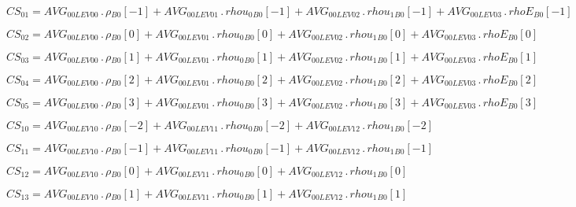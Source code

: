 \documentclass{article}
\begin{document}
\begin{dmath}CS_{01} = AVG_{0 0 LEV 00} \,.\, {\rho{_{B0}}}[{-1}] + AVG_{0 0 LEV 01} \,.\, {rhou_{0}{_{B0}}}[{-1}] + AVG_{0 0 LEV 02} \,.\, {rhou_{1}{_{B0}}}[{-1}] + AVG_{0 0 LEV 03} \,.\, {rhoE{_{B0}}}[{-1}]\end{dmath}

\begin{dmath}CS_{02} = AVG_{0 0 LEV 00} \,.\, {\rho{_{B0}}}[{0}] + AVG_{0 0 LEV 01} \,.\, {rhou_{0}{_{B0}}}[{0}] + AVG_{0 0 LEV 02} \,.\, {rhou_{1}{_{B0}}}[{0}] + AVG_{0 0 LEV 03} \,.\, {rhoE{_{B0}}}[{0}]\end{dmath}

\begin{dmath}CS_{03} = AVG_{0 0 LEV 00} \,.\, {\rho{_{B0}}}[{1}] + AVG_{0 0 LEV 01} \,.\, {rhou_{0}{_{B0}}}[{1}] + AVG_{0 0 LEV 02} \,.\, {rhou_{1}{_{B0}}}[{1}] + AVG_{0 0 LEV 03} \,.\, {rhoE{_{B0}}}[{1}]\end{dmath}

\begin{dmath}CS_{04} = AVG_{0 0 LEV 00} \,.\, {\rho{_{B0}}}[{2}] + AVG_{0 0 LEV 01} \,.\, {rhou_{0}{_{B0}}}[{2}] + AVG_{0 0 LEV 02} \,.\, {rhou_{1}{_{B0}}}[{2}] + AVG_{0 0 LEV 03} \,.\, {rhoE{_{B0}}}[{2}]\end{dmath}

\begin{dmath}CS_{05} = AVG_{0 0 LEV 00} \,.\, {\rho{_{B0}}}[{3}] + AVG_{0 0 LEV 01} \,.\, {rhou_{0}{_{B0}}}[{3}] + AVG_{0 0 LEV 02} \,.\, {rhou_{1}{_{B0}}}[{3}] + AVG_{0 0 LEV 03} \,.\, {rhoE{_{B0}}}[{3}]\end{dmath}

\begin{dmath}CS_{10} = AVG_{0 0 LEV 10} \,.\, {\rho{_{B0}}}[{-2}] + AVG_{0 0 LEV 11} \,.\, {rhou_{0}{_{B0}}}[{-2}] + AVG_{0 0 LEV 12} \,.\, {rhou_{1}{_{B0}}}[{-2}]\end{dmath}

\begin{dmath}CS_{11} = AVG_{0 0 LEV 10} \,.\, {\rho{_{B0}}}[{-1}] + AVG_{0 0 LEV 11} \,.\, {rhou_{0}{_{B0}}}[{-1}] + AVG_{0 0 LEV 12} \,.\, {rhou_{1}{_{B0}}}[{-1}]\end{dmath}

\begin{dmath}CS_{12} = AVG_{0 0 LEV 10} \,.\, {\rho{_{B0}}}[{0}] + AVG_{0 0 LEV 11} \,.\, {rhou_{0}{_{B0}}}[{0}] + AVG_{0 0 LEV 12} \,.\, {rhou_{1}{_{B0}}}[{0}]\end{dmath}

\begin{dmath}CS_{13} = AVG_{0 0 LEV 10} \,.\, {\rho{_{B0}}}[{1}] + AVG_{0 0 LEV 11} \,.\, {rhou_{0}{_{B0}}}[{1}] + AVG_{0 0 LEV 12} \,.\, {rhou_{1}{_{B0}}}[{1}]\end{dmath}
\end{document}
